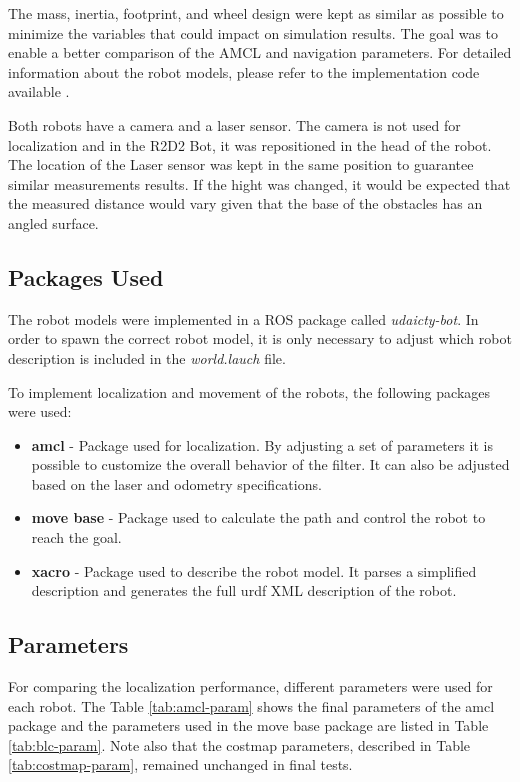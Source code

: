 \documentclass[10pt,journal,compsoc]{IEEEtran}
\begin{document}
The mass, inertia, footprint, and wheel design were kept as similar as possible to minimize the variables that could impact on simulation results. The goal was to enable a better comparison of the AMCL and navigation parameters. For detailed information about the robot models, please refer to the implementation code available \cite{luisfelipewb-repo}.

Both robots have a camera and a laser sensor. The camera is not used for localization and in the R2D2 Bot, it was repositioned in the head of the robot. The location of the Laser sensor was kept in the same position to guarantee similar measurements results. If the hight was changed, it would be expected that the measured distance would vary given that the base of the obstacles has an angled surface.

\subsection{Packages Used}
The robot models were implemented in a ROS package called \textit{udaicty-bot}. In order to spawn the correct robot model, it is only necessary to adjust which robot description is included in the \textit{world.lauch} file.

To implement localization and movement of the robots, the following packages were used:
\begin{itemize}
	\item \textbf{amcl} - Package used for localization. By adjusting a set of parameters it is possible to customize the overall behavior of the filter. It can also be adjusted based on the laser and odometry specifications.
	\item \textbf{move base} - Package used to calculate the path and control the robot to reach the goal.
	\item \textbf{xacro} - Package used to describe the robot model. It parses a simplified description and generates the full urdf XML description of the robot.
\end{itemize}


\subsection{Parameters}

For comparing the localization performance, different parameters were used for each robot. 
The Table \ref{tab:amcl-param} shows the final parameters of the amcl package and the parameters used in the move base package are listed in Table \ref{tab:blc-param}. Note also that the costmap parameters, described in Table \ref{tab:costmap-param}, remained unchanged in final tests. 
\end{document}
